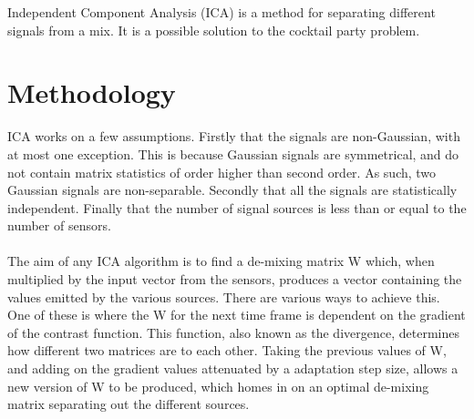 \label{appendix:ica}
Independent Component Analysis (ICA) is a method for separating different signals from a mix.
It is a possible solution to the cocktail party problem.

\section{Methodology}

ICA works on a few assumptions.
Firstly that the signals are non-Gaussian, with at most one exception.
This is because Gaussian signals are symmetrical, and do not contain matrix statistics of order higher than second order.
As such, two Gaussian signals are non-separable.
Secondly that all the signals are statistically independent.
Finally that the number of signal sources is less than or equal to the number of sensors.
\\
\\
The aim of any ICA algorithm is to find a de-mixing matrix W which, when multiplied by the input vector from the sensors, produces a vector containing the values emitted by the various sources.
There are various ways to achieve this.
One of these is where the W for the next time frame is dependent on the gradient of the contrast function.
This function, also known as the divergence, determines how different two matrices are to each other.
Taking the previous values of W, and adding on the gradient values attenuated by a adaptation step size, allows a new version of W to be produced, which homes in on an optimal de-mixing matrix separating out the different sources.

